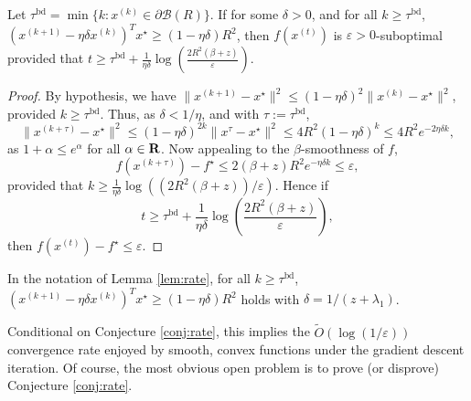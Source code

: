 \documentclass[11pt]{article}
\let\epsilon\varepsilon
\begin{document}
\begin{lem}\label{lem:rate}
  Let $\tau^{\mathrm{bd}} = \min \{ k : x^{(k)} \in \partial \mathcal{B}(R)\}$. If for some $\delta  > 0$, and for all
  $k \geq \tau^{\mathrm{bd}}$, $(x^{(k+1)} - \eta \delta x^{(k)})^Tx^\star \geq (1 - \eta \delta)R^2$, then $f(x^{(t)})$ is $\epsilon > 0$-suboptimal
  provided that $t \geq \tau^{\mathrm{bd}} + \frac{1}{\eta \delta} \log\left(\frac{2 R^2 (\beta + z)}{\epsilon}\right)$. 
\end{lem}
\begin{proof}
  By hypothesis, we have $\|x^{(k + 1)} - x^\star\|^2 \leq (1 - \eta \delta)^2 \|x^{(k)} - x^\star\|^2$, provided
  $k \geq \tau^{\mathrm{bd}}$. Thus, as $\delta < 1 /\eta$, and with $\tau := \tau^{\mathrm{bd}}$,
  \[
  \|x^{(k + \tau)} - x^\star\|^2 \leq (1 - \eta \delta)^{2k} \|x^{\tau} - x^\star\|^2 \leq 4R^2 (1 - \eta \delta)^k \leq 4R^2 e^{-2\eta \delta k},
  \]
  as $1 + \alpha \leq e^{\alpha}$ for all $\alpha \in \mathbf{R}$. Now appealing to the $\beta$-smoothness of $f$,
  \[ 
  f(x^{(k + \tau)}) - f^\star \leq 2(\beta + z) R^2 e^{-\eta \delta k} \leq \epsilon,
  \]
  provided that $k \geq \frac{1}{\eta \delta} \log((2 R^2(\beta + z))/\epsilon)$. Hence if
  \[
  t \geq \tau^{\mathrm{bd}} + \frac{1}{\eta \delta} \log\left(\frac{2 R^2 (\beta + z)}{\epsilon}\right),
  \]
  then $f(x^{(t)}) - f^\star \leq \epsilon$. 
\end{proof}
\begin{conj}\label{conj:rate}
  In the notation of Lemma \ref{lem:rate}, for all $k \geq \tau^{\mathrm{bd}}$,
  $(x^{(k+1)} - \eta \delta x^{(k)})^Tx^\star \geq (1 - \eta \delta)R^2$ holds with $\delta = 1/(z + \lambda_1)$. 
\end{conj}
Conditional on Conjecture \ref{conj:rate}, this implies the $\tilde O(\log(1/\epsilon))$ convergence rate enjoyed
by smooth, convex functions under the gradient descent iteration. Of course, the most obvious open problem is to prove (or disprove)
Conjecture \ref{conj:rate}. 

\end{document}
